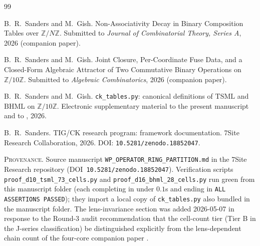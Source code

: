 \documentclass[11pt,reqno]{amsart}
\theoremstyle{plain}
\theoremstyle{definition}
\theoremstyle{remark}
\newcommand{\Z}{\mathbb{Z}}
\newcommand{\Zten}{\Z/10\Z}
\newcommand{\TSML}{\mathrm{TSML}}
\newcommand{\BHML}{\mathrm{BHML}}
\begin{document}
\begin{thebibliography}{99}

B.~R.~Sanders and M.~Gish.
\newblock Non-Associativity Decay in Binary Composition Tables
over $\mathbb{Z}/N\mathbb{Z}$.
\newblock Submitted to \emph{Journal of Combinatorial Theory,
Series A}, 2026 (companion paper).

B.~R.~Sanders and M.~Gish.
\newblock Joint Closure, Per-Coordinate Fuse Data, and a
Closed-Form Algebraic Attractor of Two Commutative Binary
Operations on $\mathbb{Z}/10\mathbb{Z}$.
\newblock Submitted to \emph{Algebraic Combinatorics}, 2026
(companion paper).

B.~R.~Sanders and M.~Gish.
\newblock \texttt{ck\_tables.py}: canonical definitions of
$\TSML$ and $\BHML$ on $\Zten$.
\newblock Electronic supplementary material to the present
manuscript and to \cite{J14,J15}, 2026.

B.~R.~Sanders.
\newblock TIG/CK research program: framework documentation.
\newblock 7Site Research Collaboration, 2026.
\newblock DOI: \texttt{10.5281/zenodo.18852047}.

\end{thebibliography}

\vfill
\noindent
\footnotesize{%
\textsc{Provenance.}\; Source manuscript
\texttt{WP\_OPERATOR\_RING\_PARTITION.md} in the 7Site Research
repository (DOI~\texttt{10.5281/zenodo.18852047}). Verification
scripts \texttt{proof\_d10\_tsml\_73\_cells.py} and
\texttt{proof\_d16\_bhml\_28\_cells.py} run green from this
manuscript folder (each completing in under $0.1$s and ending in
\texttt{ALL ASSERTIONS PASSED}); they import a local copy of
\texttt{ck\_tables.py} also bundled in the manuscript folder. The
lens-invariance section was added 2026-05-07 in response to the
Round-3 audit recommendation that the cell-count tier (Tier B in
the J-series classification) be distinguished explicitly from the
lens-dependent chain count of the four-core companion paper
\cite{J15}.}
\end{document}
